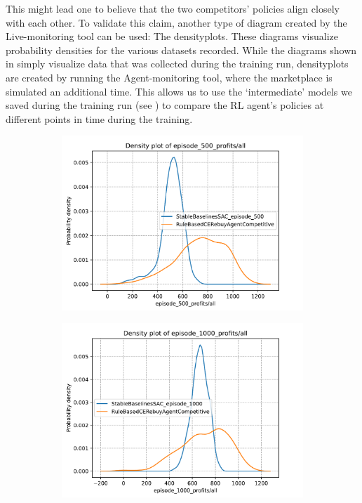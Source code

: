 This might lead one to believe that the two competitors' policies align closely with each other. To validate this claim, another type of diagram created by the Live-monitoring tool can be used: The densityplots. These diagrams visualize probability densities for the various datasets recorded. While the diagrams shown in  simply visualize data that was collected during the training run, densityplots are created by running the Agent-monitoring tool, where the marketplace is simulated an additional time. This allows us to use the `intermediate' models we saved during the training run (see ) to compare the RL agent's policies at different points in time during the training.

\begin{figure}[t]
	\centering
	\begin{subfigure}{0.49\textwidth}
		\centering
		\includegraphics[width = \textwidth]{images/experiments/SACDuopoly/SACDuopolyProfitsDensity1.pdf}\\
		\label{fig:SACDuopolyProfitsDensity1}
	\end{subfigure}
	\begin{subfigure}{0.49\textwidth}
		\centering
		\includegraphics[width = \textwidth]{images/experiments/SACDuopoly/SACDuopolyProfitsDensity2.pdf}\\

\end{subfigure}
\end{figure}
